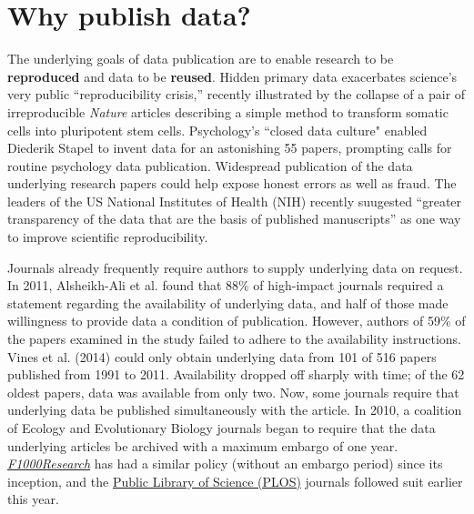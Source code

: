 \documentclass[10pt,a4paper,twocolumn]{article}
\begin{document}
\section*{Why publish data?}\label{why-publish-data}

The underlying goals of data publication are to enable research to be \textbf{reproduced} and data to be \textbf{reused}.
Hidden primary data exacerbates science's very public ``reproducibility crisis,''\cite{mobley_survey_2013,pashler_is_2012,zimmer_rise_2012,hiltzik_science_2013,begley_drug_2012} recently illustrated by the collapse of a pair of irreproducible \textit{Nature} articles describing a simple method to transform somatic cells into pluripotent stem cells\cite{cyranoski_acid-bath_2014, tabuchi_one_2014}.
Psychology's ``closed data culture"\cite{doorn_lies_2013} enabled Diederik Stapel to invent data for an astonishing 55 papers, prompting calls for routine psychology data publication\cite{levelt_committee_flawed_2012,wicherts_psychology_2011,doorn_lies_2013}. 
Widespread publication of the data underlying research papers could help expose honest errors as well as fraud\cite{drew_lost_2013}.
The leaders of the US National Institutes of Health (NIH) recently suugested ``greater transparency of the data that are the basis of published manuscripts'' as one way to improve scientific reproducibility\cite{collins_nih_2014}.

Journals already frequently require authors to supply underlying data on request.
In 2011, Alsheikh-Ali et al.\cite{alsheikh-ali_public_2011} found that 88\% of high-impact journals required a statement regarding the availability of underlying data, and half of those made willingness to provide data a condition of publication.
However, authors of 59\% of the papers examined in the study failed to adhere to the availability instructions.
Vines et al. (2014)\cite{vines_availability_2014} could only obtain underlying data from 101 of 516 papers published from 1991 to 2011.
Availability dropped off sharply with time; of the 62 oldest papers, data was available from only two.
Now, some journals require that underlying data be published simultaneously with the article.
In 2010, a coalition of Ecology and Evolutionary Biology journals began to require that the data underlying articles be archived with a maximum embargo of one year\cite{whitlock_data_2010, fairbairn_advent_2011}.
\href{http://f1000research.com}{\emph{F1000Research}} has had a similar policy (without an embargo period) since its inception, and the {\href{http://www.plos.org/}{Public Library of Science (PLOS)}} journals followed suit earlier this year\cite{bloom_data_2014}.
\end{document}
